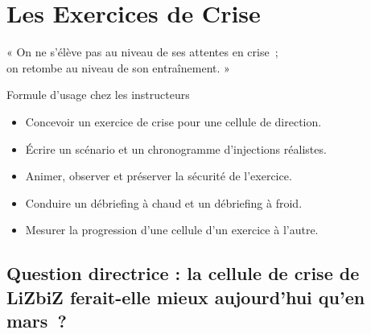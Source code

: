 
\chapter{Les Exercices de Crise}
\label{chap:exercices-crise}

\epigraph{%
    « On ne s'élève pas au niveau de ses attentes en crise~;\\
    on retombe au niveau de son entraînement. »%
}{Formule d'usage chez les instructeurs}


\begin{boxobjectifs}
\begin{itemize}
    \item Concevoir un exercice de crise pour une cellule de direction.
    \item Écrire un scénario et un chronogramme d'injections réalistes.
    \item Animer, observer et préserver la sécurité de l'exercice.
    \item Conduire un débriefing à chaud et un débriefing à froid.
    \item Mesurer la progression d'une cellule d'un exercice à l'autre.
\end{itemize}
\end{boxobjectifs}

\bigskip

\section*{Question directrice : la cellule de crise de LiZbiZ ferait-elle mieux aujourd'hui qu'en mars~?}

